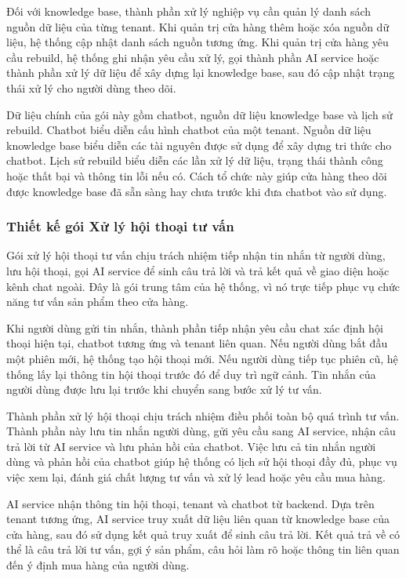 \documentclass[../DoAn.tex]{subfiles}
\begin{document}
Đối với knowledge base, thành phần xử lý nghiệp vụ cần quản lý danh sách nguồn dữ liệu của từng tenant. Khi quản trị cửa hàng thêm hoặc xóa nguồn dữ liệu, hệ thống cập nhật danh sách nguồn tương ứng. Khi quản trị cửa hàng yêu cầu rebuild, hệ thống ghi nhận yêu cầu xử lý, gọi thành phần AI service hoặc thành phần xử lý dữ liệu để xây dựng lại knowledge base, sau đó cập nhật trạng thái xử lý cho người dùng theo dõi.

Dữ liệu chính của gói này gồm chatbot, nguồn dữ liệu knowledge base và lịch sử rebuild. Chatbot biểu diễn cấu hình chatbot của một tenant. Nguồn dữ liệu knowledge base biểu diễn các tài nguyên được sử dụng để xây dựng tri thức cho chatbot. Lịch sử rebuild biểu diễn các lần xử lý dữ liệu, trạng thái thành công hoặc thất bại và thông tin lỗi nếu có. Cách tổ chức này giúp cửa hàng theo dõi được knowledge base đã sẵn sàng hay chưa trước khi đưa chatbot vào sử dụng.

\subsubsection{Thiết kế gói Xử lý hội thoại tư vấn}

Gói xử lý hội thoại tư vấn chịu trách nhiệm tiếp nhận tin nhắn từ người dùng, lưu hội thoại, gọi AI service để sinh câu trả lời và trả kết quả về giao diện hoặc kênh chat ngoài. Đây là gói trung tâm của hệ thống, vì nó trực tiếp phục vụ chức năng tư vấn sản phẩm theo cửa hàng.

Khi người dùng gửi tin nhắn, thành phần tiếp nhận yêu cầu chat xác định hội thoại hiện tại, chatbot tương ứng và tenant liên quan. Nếu người dùng bắt đầu một phiên mới, hệ thống tạo hội thoại mới. Nếu người dùng tiếp tục phiên cũ, hệ thống lấy lại thông tin hội thoại trước đó để duy trì ngữ cảnh. Tin nhắn của người dùng được lưu lại trước khi chuyển sang bước xử lý tư vấn.

Thành phần xử lý hội thoại chịu trách nhiệm điều phối toàn bộ quá trình tư vấn. Thành phần này lưu tin nhắn người dùng, gửi yêu cầu sang AI service, nhận câu trả lời từ AI service và lưu phản hồi của chatbot. Việc lưu cả tin nhắn người dùng và phản hồi của chatbot giúp hệ thống có lịch sử hội thoại đầy đủ, phục vụ việc xem lại, đánh giá chất lượng tư vấn và xử lý lead hoặc yêu cầu mua hàng.

AI service nhận thông tin hội thoại, tenant và chatbot từ backend. Dựa trên tenant tương ứng, AI service truy xuất dữ liệu liên quan từ knowledge base của cửa hàng, sau đó sử dụng kết quả truy xuất để sinh câu trả lời. Kết quả trả về có thể là câu trả lời tư vấn, gợi ý sản phẩm, câu hỏi làm rõ hoặc thông tin liên quan đến ý định mua hàng của người dùng.
\end{document}
